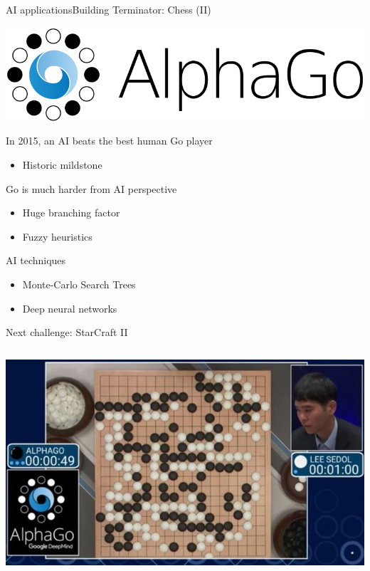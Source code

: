 \documentclass[10pt,compress]{beamer} %
\begin{document}
\begin{frame}{AI applications}{Building Terminator: Chess (II)}
	\vspace{-2cm}

	\begin{center}
		\includegraphics[width=0.4\linewidth]{figs/alphago.png}
	\end{center}

	\vspace{-0.2cm}
	In 2015, an AI beats the best human Go player
	\begin{itemize}
		\item Historic mildstone
	\end{itemize}
	Go is much harder from AI perspective
	\begin{itemize}
		\item Huge branching factor
		\item Fuzzy heuristics
	\end{itemize}
	AI techniques
	\begin{itemize}
		\item Monte-Carlo Search Trees
		\item Deep neural networks
	\end{itemize}
	Next challenge: StarCraft II

	\vspace{-4cm}
	\begin{columns}
		\includegraphics[width=\linewidth]{figs/leesedol.jpg}
	\end{columns}
\end{frame}
\end{document}
